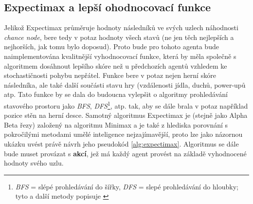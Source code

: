 \subsection{Expectimax a lepší ohodnocovací funkce}
\label{navrh:expectimax}
Jelikož Expectimax průměruje hodnoty následníků ve svých uzlech náhodnosti \textit{chance node}, bere tedy v potaz hodnoty všech stavů (ne jen těch nejlepších a nejhorších, jak tomu bylo doposud). Proto bude pro tohoto agenta bude naimplementována kvalitnější vyhodnocovací funkce, která by měla společně s algoritmem dosáhnout lepšího skóre než u předchozích agentů vzhledem ke stochastičnosti pohybu nepřátel. Funkce bere v potaz nejen herní skóre následníka, ale také další součásti stavu hry (vzdálenosti jídla, duchů, power-upů atp. Tato funkce by se dala do budoucna vylepšit o algoritmy prohledávání stavového prostoru jako \textit{BFS}, \textit{DFS}\footnote{\textit{BFS} = slépé prohledávání do šířky, \textit{DFS} = slepé prohledávání do hloubky; tyto a další metody popisuje \cite{AI1}}, atp. tak, aby se dále brala v potaz například pozice stěn na herní desce. 
\newline
Samotný algoritmus Expectimax je (stejně jako Alpha Beta řezy) založený na algoritmu Minimax a je také z hlediska porovnání s pokročilými metodami umělé inteligence nejzajímavější, proto lze jako názornou ukázku uvést právě návrh jeho pseudokód \ref{alg:expectimax}. Algoritmus se dále bude muset provázat s \textbf{akcí}, jež má každý agent provést na základě vyhodnocené hodnoty svého uzlu.

